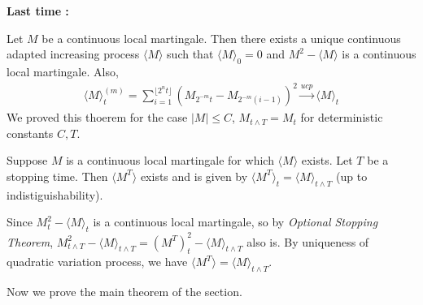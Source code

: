 \documentclass[12pt,a4paper]{article}
\newenvironment{proof}
{\begin{changemargin}{0.5cm}{0.5cm} 
	}%
	{\end{changemargin}
}
\newenvironment{p}
{\begin{proof} 
	}%
	{\end{proof}
}
\begin{document}
\textbf{Last time :}

\thm Let $M$ be a continuous local martingale. Then there exists a unique continuous adapted increasing process $\langle M \rangle$ such that $\langle  M \rangle_0 = 0$ and $M^2 - \langle M \rangle$ is a continuous local martingale. Also,
\begin{align*}
\langle M \rangle_t^{(m)} = \sum_{i=1}^{\lfloor 2^n t \rfloor} (M_{2^{-m}t} - M_{2^{-m}(i-1)})^2 \xrightarrow{ucp} \langle M \rangle_t
\end{align*}
We proved this thoerem for the case $|M|\leq C$, $M_{t\wedge T} = M_t$ for deterministic constants $C, T$. 
\s

\lem Suppose $M$ is a continuous local martingale for which $\langle M \rangle$ exists. Let $T$ be a stopping time. Then $\langle M^T \rangle$ exists and is given by $\langle M^T\rangle_t = \langle M \rangle_{t\wedge T}$ (up to indistiguishability).
\begin{p}
\pf Since $M_t^2 - \langle M \rangle_t$ is a continuous local martingale, so by \emph{Optional Stopping Theorem}, $M^2_{t\wedge T} - \langle M\rangle_{t\wedge T}= (M^T)^2_t - \langle M \rangle_{t\wedge T}$ also is. By uniqueness of quadratic variation process, we have $\langle M^T \rangle = \langle M \rangle_{t\wedge T}$.

\eop
\end{p}
\s

Now we prove the main theorem of the section.
\s
\end{document}
